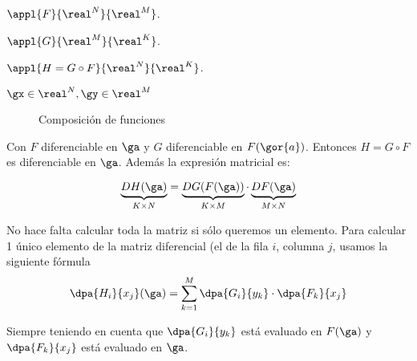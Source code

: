 $\appl{F}{\real^N}{\real^M}$. 

$\appl{G}{\real^M}{\real^K}$.

$\appl{H=G\circ F}{\real^N}{\real^K}$.

$ \gx \in \real^N, \gy \in \real^M$

\begin{wrapfigure}{r}{0.3\textwidth}
\begin{center}
\end{center}
\caption{Composición de funciones}
\end{wrapfigure}

Con $F$ diferenciable en $\ga$ y $G$ diferenciable en $F(\gor{a})$. Entonces $H=G\circ F$ es diferenciable en $\ga $.
Además la expresión matricial es:

\[ \underbrace{DH(\ga)}_{K\times N} = \underbrace{DG(F(\ga))}_{K\times M}\cdot \underbrace{DF(\ga)}_{M\times N} \]
 
No hace falta calcular toda la matriz si sólo queremos un elemento. Para calcular 1 único elemento de la matriz diferencial (el de la fila $i$, columna $j$, usamos la siguiente fórmula
\[ \dpa{H_i}{x_j}(\ga) = \sum_{k=1}^M \dpa{G_i}{y_k}\cdot\dpa{F_k}{x_j} \]

Siempre teniendo en cuenta que $\displaystyle\dpa{G_i}{y_k}$ está evaluado en $F(\ga)$ y $\displaystyle\dpa{F_k}{x_j}$ está evaluado en $\ga$.


